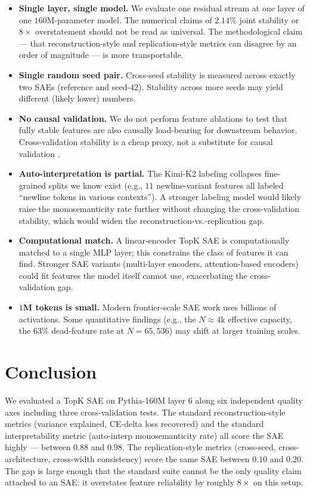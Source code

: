 \documentclass[11pt]{article}
\begin{document}
\begin{itemize}
\item \textbf{Single layer, single model.} We evaluate one residual stream
at one layer of one $160$M-parameter model. The numerical claims of
$2.14\%$ joint stability or $8\times$ overstatement should not be
read as universal. The methodological claim --- that
reconstruction-style and replication-style metrics can disagree by an
order of magnitude --- is more transportable.
\item \textbf{Single random seed pair.} Cross-seed stability is measured
across exactly two SAEs (reference and seed-$42$). Stability across
more seeds may yield different (likely lower) numbers.
\item \textbf{No causal validation.} We do not perform feature ablations
to test that fully stable features are also causally load-bearing for
downstream behavior. Cross-validation stability is a cheap proxy, not
a substitute for causal validation \cite{conmy2024automated,
marks2024feature}.
\item \textbf{Auto-interpretation is partial.} The Kimi-K2 labeling
collapses fine-grained splits we know exist (e.g., $11$ newline-variant
features all labeled ``newline tokens in various contexts''). A stronger
labeling model would likely raise the monosemanticity rate further
without changing the cross-validation stability, which would widen the
reconstruction-vs.-replication gap.
\item \textbf{Computational match.} A linear-encoder TopK SAE is
computationally matched to a single MLP layer; this constrains the
class of features it can find. Stronger SAE variants (multi-layer
encoders, attention-based encoders) could fit features the model itself
cannot use, exacerbating the cross-validation gap.
\item \textbf{$1$M tokens is small.} Modern frontier-scale SAE work uses
billions of activations. Some quantitative findings (e.g., the
$N \approx 4\text{k}$ effective capacity, the $63\%$ dead-feature rate
at $N = 65{,}536$) may shift at larger training scales.
\end{itemize}

\section{Conclusion}

We evaluated a TopK SAE on Pythia-160M layer $6$ along six independent
quality axes including three cross-validation tests. The standard
reconstruction-style metrics (variance explained, CE-delta loss
recovered) and the standard interpretability metric (auto-interp
monosemanticity rate) all score the SAE highly --- between $0.88$ and
$0.98$. The replication-style metrics (cross-seed, cross-architecture,
cross-width consistency) score the same SAE between $0.10$ and $0.20$.
The gap is large enough that the standard suite cannot be the only
quality claim attached to an SAE: it overstates feature reliability by
roughly $8\times$ on this setup.
\end{document}

